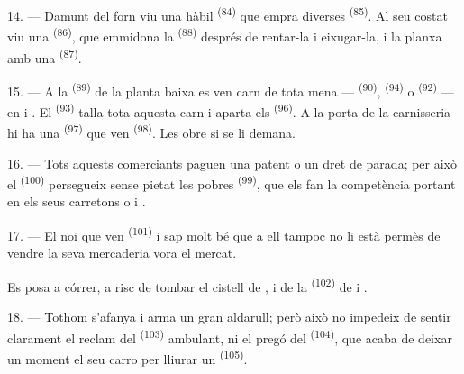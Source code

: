 14. --- Damunt del forn viu una hàbil  \textsuperscript{(84)} que empra
diverses  \textsuperscript{(85)}. Al seu costat viu una
 \textsuperscript{(86)}, que emmidona la  \textsuperscript{(88)} després de rentar-la i eixugar-la, i la planxa amb una
 \textsuperscript{(87)}.

\VUsaut{4.0mm}
\VUsaut{3.0mm}

15. --- A la  \textsuperscript{(89)} de la planta baixa es ven carn de
tota mena ---  \textsuperscript{(90)},  \textsuperscript{(94)} o
 \textsuperscript{(92)} --- en
 i . El  \textsuperscript{(93)} talla tota aquesta carn i aparta els
 \textsuperscript{(96)}. A la porta de la carnisseria hi ha
una  \textsuperscript{(97)} que ven  \textsuperscript{(98)}.
Les obre si se li demana.

16. --- Tots aquests comerciants paguen una patent o un dret de parada; per això el
 \textsuperscript{(100)} persegueix sense pietat les pobres
 \textsuperscript{(99)}, que els fan la competència
portant en els seus carretons  o
 i
.

\VUsaut{4.0mm}
\VUsaut{3.0mm}

17. --- El noi que ven  \textsuperscript{(101)} i  sap molt bé que
a ell tampoc no li està permès de vendre la seva mercaderia vora el mercat.

Es posa a córrer, a risc de tombar el cistell de ,
 i  de la 
\textsuperscript{(102)} de  i .

18. --- Tothom s'afanya i arma un gran aldarull; però això no impedeix de sentir clarament el
reclam del  \textsuperscript{(103)} ambulant, ni el pregó del
 \textsuperscript{(104)}, que acaba de deixar un moment el seu carro per
lliurar un  \textsuperscript{(105)}.
\VUsaut{6.0mm}
\VUfilet{22mm}
